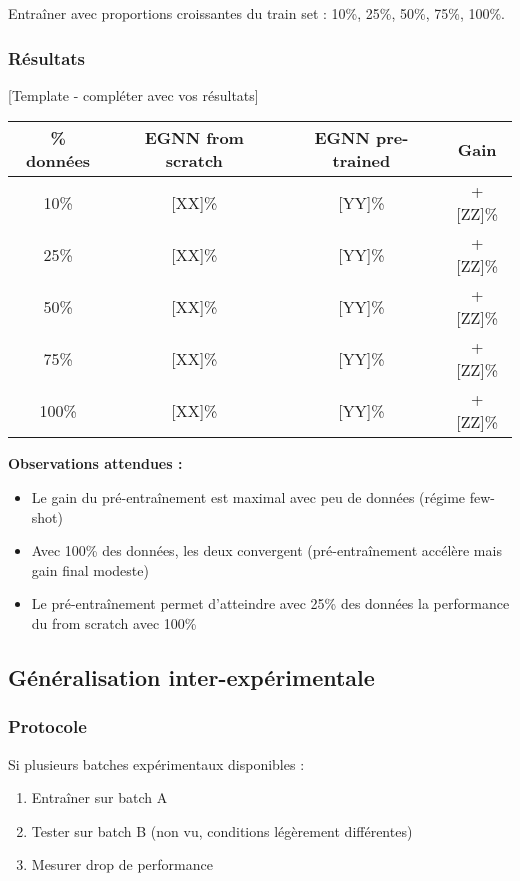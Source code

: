 Entraîner avec proportions croissantes du train set : 10\%, 25\%, 50\%, 75\%, 100\%.

\subsubsection{Résultats}

[Template - compléter avec vos résultats]

\begin{center}
\begin{tabular}{|c|c|c|c|}
\hline
\textbf{\% données} & \textbf{EGNN from scratch} & \textbf{EGNN pre-trained} & \textbf{Gain} \\
\hline
10\% & [XX]\% & [YY]\% & +[ZZ]\% \\
25\% & [XX]\% & [YY]\% & +[ZZ]\% \\
50\% & [XX]\% & [YY]\% & +[ZZ]\% \\
75\% & [XX]\% & [YY]\% & +[ZZ]\% \\
100\% & [XX]\% & [YY]\% & +[ZZ]\% \\
\hline
\end{tabular}
\end{center}

\textbf{Observations attendues :}
\begin{itemize}
    \item Le gain du pré-entraînement est maximal avec peu de données (régime few-shot)
    \item Avec 100\% des données, les deux convergent (pré-entraînement accélère mais gain final modeste)
    \item Le pré-entraînement permet d'atteindre avec 25\% des données la performance du from scratch avec 100\%
\end{itemize}

\subsection{Généralisation inter-expérimentale}

\subsubsection{Protocole}

Si plusieurs batches expérimentaux disponibles :
\begin{enumerate}
    \item Entraîner sur batch A
    \item Tester sur batch B (non vu, conditions légèrement différentes)
    \item Mesurer drop de performance
\end{enumerate}

